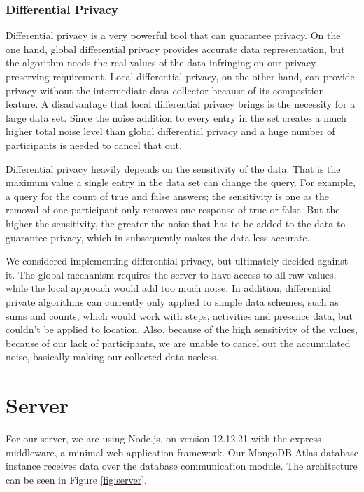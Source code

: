 \subsubsection{Differential Privacy}
Differential privacy is a very powerful tool that can guarantee privacy. On the one hand, global differential privacy provides accurate data representation, but the algorithm needs the real values of the data infringing on our privacy-preserving requirement. Local differential privacy, on the other hand, can provide privacy without the intermediate data collector because of its composition feature. A disadvantage that local differential privacy brings is the necessity for a large data set. Since the noise addition to every entry in the set creates a much higher total noise level than global differential privacy and a huge number of participants is needed to cancel that out. 

Differential privacy heavily depends on the sensitivity of the data. That is the maximum value a single entry in the data set can change the query. For example, a query for the count of true and false answers; the sensitivity is one as the removal of one participant only removes one response of true or false. But the higher the sensitivity, the greater the noise that has to be added to the data to guarantee privacy, which in subsequently makes the data less accurate.

We considered implementing differential privacy, but ultimately decided against it. The global mechanism requires the server to have access to all raw values, while the local approach would add too much noise. In addition, differential private algorithms can currently only applied to simple data schemes, such as sums and counts, which would work with steps, activities and presence data, but couldn't be applied to location. Also, because of the high sensitivity of the values, because of our lack of participants, we are unable to cancel out the accumulated noise, basically making our collected data useless.

\section{Server}
For our server, we are using Node.js, on version 12.12.21 with the express \cite{express} middleware, a minimal web application framework. Our MongoDB Atlas database instance receives data over the database communication module. The architecture can be seen in Figure \ref{fig:server}.

